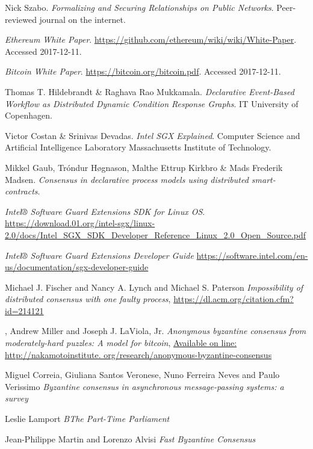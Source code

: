 \documentclass{article}
\begin{document}
	\begin{thebibliography}{9}

		Nick Szabo.
		\textit{Formalizing and Securing Relationships on Public Networks}.
		Peer-reviewed journal on the internet.

		\textit{Ethereum White Paper}.
		\url{https://github.com/ethereum/wiki/wiki/White-Paper}.
		Accessed 2017-12-11.

		\textit{Bitcoin White Paper}.
		\url{https://bitcoin.org/bitcoin.pdf}.
		Accessed 2017-12-11.

		Thomas T. Hildebrandt \& Raghava Rao Mukkamala.
		\textit{Declarative Event-Based Workflow as Distributed Dynamic Condition Response Graphs}.
		IT University of Copenhagen.

		Victor Costan \& Srinivas Devadas.
		\textit{Intel SGX Explained}.
		Computer Science and Artificial Intelligence Laboratory Massachusetts Institute of Technology.

		Mikkel Gaub, Tróndur Høgnason, Malthe Ettrup Kirkbro \& Mads Frederik Madsen.
		\textit{Consensus in declarative process models using distributed smart-contracts}.

		\textit{Intel® Software Guard Extensions SDK for Linux OS}.
		\url{https://download.01.org/intel-sgx/linux-2.0/docs/Intel_SGX_SDK_Developer_Reference_Linux_2.0_Open_Source.pdf}

		\textit{Intel® Software Guard Extensions Developer Guide}
		\url{https://software.intel.com/en-us/documentation/sgx-developer-guide}

		Michael J. Fischer and  Nancy A. Lynch and Michael S. Paterson
		\textit{Impossibility of distributed consensus with one faulty process},
		\url{https://dl.acm.org/citation.cfm?id=214121}

		,
		Andrew Miller and Joseph J. LaViola, Jr.
  		\textit{Anonymous byzantine consensus from moderately-hard puzzles: A model for bitcoin},
		\url{Available on line: http://nakamotoinstitute. org/research/anonymous-byzantine-consensus}

		Miguel Correia, Giuliana Santos Veronese, Nuno Ferreira Neves and Paulo Verissimo
		\textit{Byzantine consensus in asynchronous message-passing systems: a survey} 

		Leslie Lamport
		\textit{BThe Part-Time Parliament} 

		Jean-Philippe Martin and Lorenzo Alvisi
		\textit{Fast Byzantine Consensus}



	\end{thebibliography}
\end{document}
